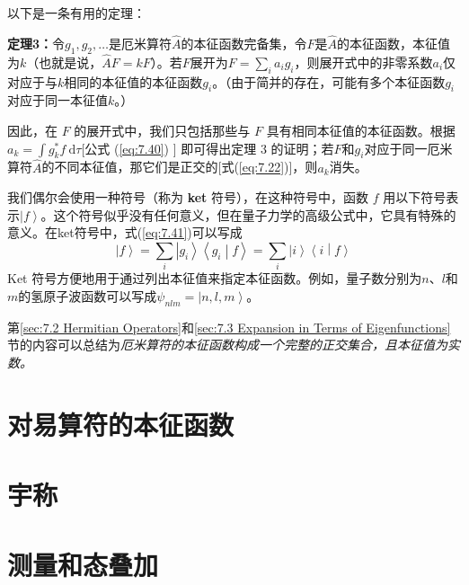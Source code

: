     以下是一条有用的定理：
    \begin{center}
        \parbox{0.8\textwidth}{
            \centering
            \textbf{定理3：}令$g_1,g_2,\ldots$是厄米算符$\hat{A}$的本征函数完备集，令$F$是$\hat{A}$的本征函数，本征值为$k$（也就是说，$\hat{A}F = kF$）。若$F$展开为$F = \sum_{i}a_ig_i$，则展开式中的非零系数$a_i$仅对应于与$k$相同的本征值的本征函数$g_i$。（由于简并的存在，可能有多个本征函数$g_i$对应于同一本征值$k$。）
            
        }
    \end{center}

    因此，在 $F$ 的展开式中，我们只包括那些与 $F$ 具有相同本征值的本征函数。根据 $a_k = \int g_k^{\ast} f \:\mathrm{d}\tau$[公式 (\ref{eq:7.40}) ] 即可得出定理 3 的证明；若$F$和$g_i$对应于同一厄米算符$\hat{A}$的不同本征值，那它们是正交的[式(\ref{eq:7.22})]，则$a_k$消失。

    我们偶尔会使用一种符号（称为 \textbf{ket} 符号），在这种符号中，函数 $f$ 用以下符号表示$\left| f \right\rangle$。这个符号似乎没有任何意义，但在量子力学的高级公式中，它具有特殊的意义。在ket符号中，式(\ref{eq:7.41})可以写成
    \begin{equation}
        \left| f \right\rangle = \sum_{i} \left| g_i\right\rangle \left\langle g_i \middle| f \right\rangle = \sum_i \left| i \right\rangle \left\langle i \middle| f \right\rangle
        \label{eq:7.42}
    \end{equation}
    Ket 符号方便地用于通过列出本征值来指定本征函数。例如，量子数分别为$n$、$l$和$m$的氢原子波函数可以写成$\psi_{nlm} = \left| n,l,m \right\rangle$。

    第\ref{sec:7.2 Hermitian Operators}和\ref{sec:7.3 Expansion in Terms of Eigenfunctions}节的内容可以总结为\textit{厄米算符的本征函数构成一个完整的正交集合，且本征值为实数。}

\section{对易算符的本征函数}
\label{sec:7.4 Eigenfunctions of Commuting Operators}










\section{宇称}
\label{sec:7.5 Parity}

\section{测量和态叠加}
\label{sec:7.6 Measurement and the Superposition of States}

